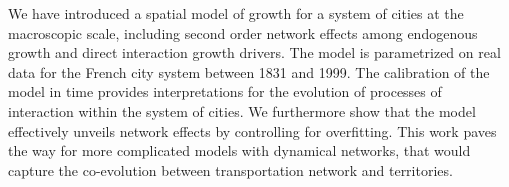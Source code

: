 \documentclass[Royal,sageh,times]{sagej}
\begin{document}
We have introduced a spatial model of growth for a system of cities at the macroscopic scale, including second order network effects among endogenous growth and direct interaction growth drivers. The model is parametrized on real data for the French city system between 1831 and 1999. The calibration of the model in time provides interpretations for the evolution of processes of interaction within the system of cities. We furthermore show that the model effectively unveils network effects by controlling for overfitting. This work paves the way for more complicated models with dynamical networks, that would capture the co-evolution between transportation network and territories.








%
%
\end{document}
